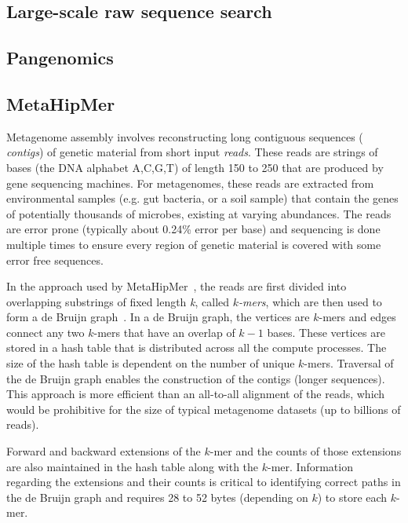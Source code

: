 \subsection{Large-scale raw sequence search}

\subsection{Pangenomics}



\subsection{MetaHipMer}

Metagenome assembly involves reconstructing long contiguous sequences ({\it
contigs}) of genetic material from short input {\it reads}. These reads are
strings of bases (the DNA alphabet A,C,G,T) of length 150 to 250 that are
produced by gene sequencing machines.  For metagenomes, these reads are
extracted from environmental samples (e.g. gut bacteria, or a soil sample) that
contain the genes of potentially thousands of microbes, existing at varying
abundances.  The reads are error prone (typically about 0.24\% error per base)
and sequencing is done multiple times to ensure every region of genetic material
is covered with some error free sequences.

In the approach used by MetaHipMer~\cite{GeorganasEHG18,HofmeyrEGC20}, the reads are first divided into overlapping
substrings of fixed length {\it k}, called {\it $k$-mers}, which are then used
to form a de Bruijn graph~\cite{CompeauPeTe11}. In a de Bruijn graph, the
vertices are $k$-mers and edges connect any two $k$-mers that have an overlap of
$k-1$ bases. These vertices are stored in a hash table that is distributed
across all the compute processes.  The size of the hash table is dependent on
the number of unique $k$-mers.  Traversal of the de Bruijn graph enables the
construction of the contigs (longer sequences).  This approach is more efficient
than an all-to-all alignment of the reads, which would be prohibitive for the
size of typical metagenome datasets (up to billions of reads).

Forward and backward extensions of the $k$-mer and the counts of those
extensions are also maintained in the hash table along with the $k$-mer.
Information regarding the extensions and their counts is critical to identifying
correct paths in the de Bruijn graph and requires 28 to 52 bytes (depending on
$k$) to store each $k$-mer.

